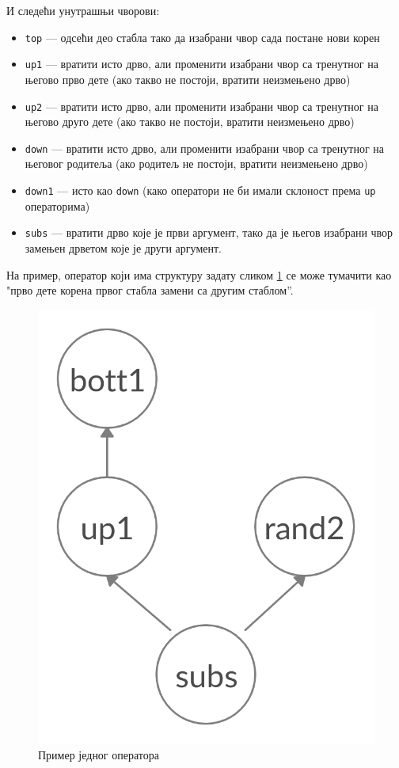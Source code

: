 \documentclass[a4paper]{article}
\begin{document}
И следећи унутрашњи чворови:

\begin{itemize}
\item \texttt{top} — одсећи део стабла тако да изабрани чвор сада постане нови корен
\item \texttt{up1} — вратити исто дрво, али променити изабрани чвор са тренутног на његово прво дете (ако такво не постоји, вратити неизмењено дрво)
\item \texttt{up2} — вратити исто дрво, али променити изабрани чвор са тренутног на његово друго дете (ако такво не постоји, вратити неизмењено дрво)
\item \texttt{down} — вратити исто дрво, али променити изабрани чвор са тренутног на његовог родитеља (ако родитељ не постоји, вратити неизмењено дрво) 
\item \texttt{down1} — исто као \texttt{down} (како оператори не би имали склоност према \texttt{up} операторима)
\item \texttt{subs} — вратити дрво које је први аргумент, тако да је његов изабрани чвор замењен дрветом које је други аргумент.
\end{itemize}

На пример, оператор који има структуру задату сликом \ref{fig:mgp_primer} се може тумачити као "прво дете корена првог стабла замени са другим стаблом''.

\begin{figure}[h!]
    \begin{center}
    \includegraphics[scale=0.15]{mgp_primer.png}
    \end{center}
    \caption{Пример једног оператора}
    \label{fig:mgp_primer}
\end{figure}
\end{document}
